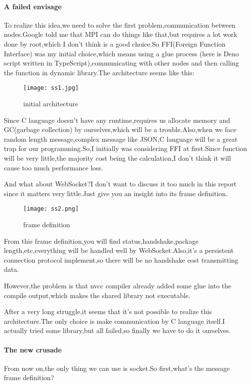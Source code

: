 \documentclass[12pt]{scrartcl} %
\begin{document}
\paragraph{A failed envisage}\;\newline
To realize this idea,we need to solve the first problem,communication between nodes.Google told me that MPI can do things like that,but requires a lot work done by root,which I don't think is a good choice.So FFI(Foreign Function Interface) was my initial choice,which means using a glue process (here is Deno script written in TypeScript),communicating with other nodes and then calling the function in dynamic library.The architecture seems like this:
\begin{figure}[H]
    \centering
    \texttt{[image: ss1.jpg]}
    \caption{initial architecture}
    \label{}
\end{figure}

Since C language doesn't have any runtime,requires us allocate memory and GC(garbage collection) by ourselves,which will be a trouble.Also,when we face random length message,complex message like JSON,C language will be a great trap for our programming.So,I initially was considering FFI at first.Since function will be very little,the majority cost being the calculation,I don't think it will cause too much performance loss.

And what about WebSocket?I don't want to discuss it too much in this report since it matters very little.Just give you an insight into its frame definition.
\begin{figure}[H]
    \centering
    \texttt{[image: ss2.png]}
    \caption{frame definition}
    \label{}
\end{figure}

From this frame definition,you will find status,handshake,package length,etc,everything will be handled well by WebSocket.Also,it's a persistent connection protocol implement,so there will be no handshake cost transmitting data.

However,the problem is that nvcc compiler already added some glue into the compile output,which makes the shared library not executable.

After a very long struggle,it seems that it's not possible to realize this architecture.The only choice is make communication by C language itself.I actually tried some library,but all failed,so finally we have to do it ourselves.
\paragraph{The new crusade}\;\newline
From now on,the only thing we can use is socket.So first,what's the message frame definition?
\end{document}
